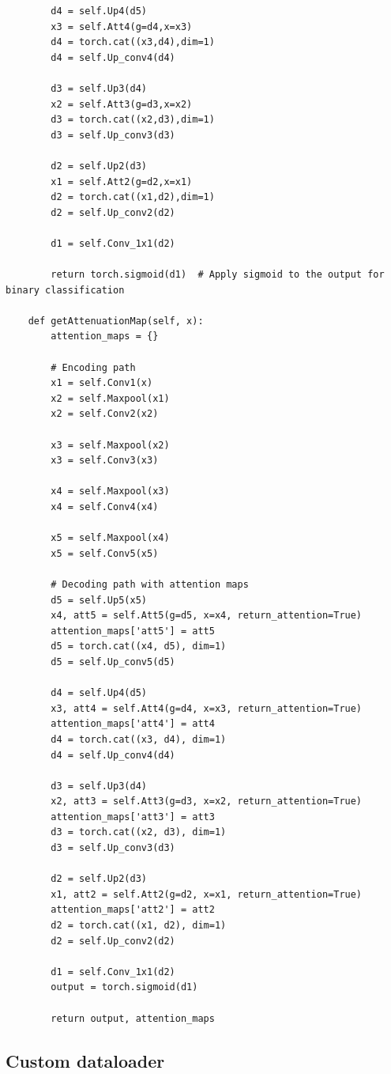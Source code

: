 \begin{verbatim}
        d4 = self.Up4(d5)
        x3 = self.Att4(g=d4,x=x3)
        d4 = torch.cat((x3,d4),dim=1)
        d4 = self.Up_conv4(d4)

        d3 = self.Up3(d4)
        x2 = self.Att3(g=d3,x=x2)
        d3 = torch.cat((x2,d3),dim=1)
        d3 = self.Up_conv3(d3)

        d2 = self.Up2(d3)
        x1 = self.Att2(g=d2,x=x1)
        d2 = torch.cat((x1,d2),dim=1)
        d2 = self.Up_conv2(d2)

        d1 = self.Conv_1x1(d2)

        return torch.sigmoid(d1)  # Apply sigmoid to the output for binary classification
    
    def getAttenuationMap(self, x):
        attention_maps = {}

        # Encoding path
        x1 = self.Conv1(x)
        x2 = self.Maxpool(x1)
        x2 = self.Conv2(x2)

        x3 = self.Maxpool(x2)
        x3 = self.Conv3(x3)

        x4 = self.Maxpool(x3)
        x4 = self.Conv4(x4)

        x5 = self.Maxpool(x4)
        x5 = self.Conv5(x5)

        # Decoding path with attention maps
        d5 = self.Up5(x5)
        x4, att5 = self.Att5(g=d5, x=x4, return_attention=True)
        attention_maps['att5'] = att5
        d5 = torch.cat((x4, d5), dim=1)
        d5 = self.Up_conv5(d5)

        d4 = self.Up4(d5)
        x3, att4 = self.Att4(g=d4, x=x3, return_attention=True)
        attention_maps['att4'] = att4
        d4 = torch.cat((x3, d4), dim=1)
        d4 = self.Up_conv4(d4)

        d3 = self.Up3(d4)
        x2, att3 = self.Att3(g=d3, x=x2, return_attention=True)
        attention_maps['att3'] = att3
        d3 = torch.cat((x2, d3), dim=1)
        d3 = self.Up_conv3(d3)

        d2 = self.Up2(d3)
        x1, att2 = self.Att2(g=d2, x=x1, return_attention=True)
        attention_maps['att2'] = att2
        d2 = torch.cat((x1, d2), dim=1)
        d2 = self.Up_conv2(d2)

        d1 = self.Conv_1x1(d2)
        output = torch.sigmoid(d1)

        return output, attention_maps
\end{verbatim}

\subsection{Custom dataloader}

